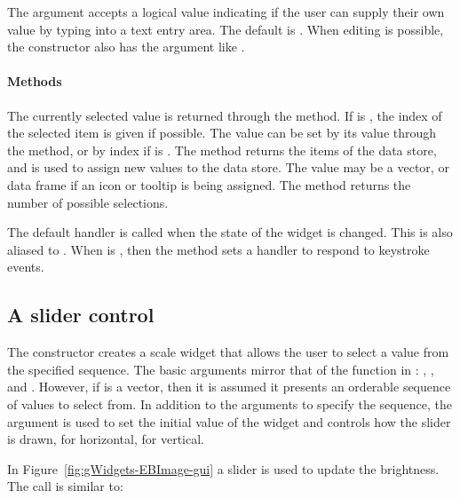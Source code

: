 The argument  accepts a logical value
indicating if the user can supply their own value by typing into a
text entry area. The default is . When editing is
possible, the constructor also has the
 argument like .

\paragraph{Methods}
The currently selected value is returned through the
 method. If  is , the
index of the selected item is given if possible. The value can be set
by its value through the  method, or
by index if  is . The \method{[}{gcombobox}
method returns the items of the data store, and
\method{[\ASSIGN}{gcombobox} is used to assign new values to the data
store. The value may be a vector, or data frame if an icon or tooltip
is being assigned. The  method returns the
number of possible selections.

The default handler is called when the state of the widget is
changed. This is also aliased to
. When  is
, then the  method
sets a handler to respond to keystroke events.



\subsection{A slider control}
\label{sec:gWidgets-slider-control}

The  constructor creates a scale widget that allows the
user to select a value from the specified sequence.  The basic
arguments mirror that of the  function in \R:
, , and
.  However, if  is a vector, then it is
assumed it presents an orderable sequence of values to select from.
In addition to the arguments to specify the sequence, the argument
 is used to set the initial value of the
widget and  controls how the slider is
drawn,  for horizontal,  for vertical.

In Figure~\ref{fig:gWidgets-EBImage-gui} a slider is used to update
the brightness. The call is similar to:
\begin{Schunk}
\end{Schunk}

